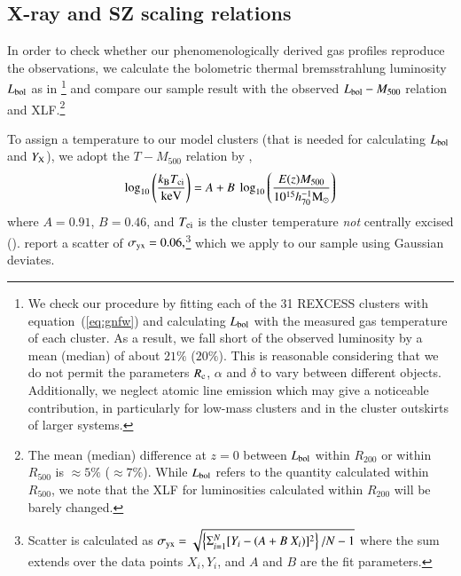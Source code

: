 \documentclass[useAMS,usenatbib]{mn2e}
\begin{document}
\subsection{X-ray and SZ scaling relations}
\label{sec:X-SZ-scaling}

In order to check whether our phenomenologically derived gas profiles reproduce
the observations, we calculate the bolometric thermal bremsstrahlung
luminosity $L_{{\mathrm{bol}}}$ as in \cite{1988xrec.book.....S}\footnote{We check
  our procedure by fitting each of the 31 REXCESS clusters with
  equation~(\ref{eq:gnfw}) and calculating $L_{{\mathrm{bol}}}$ with the measured gas
  temperature of each cluster. As a result, we fall short of the observed
  luminosity by a mean (median) of about $21\%$ ($20\%$). This is reasonable
  considering that we do not permit the parameters $R_{{\mathrm{c}}}$, $\alpha$ and
  $\delta$ to vary between different objects. Additionally, we neglect atomic
  line emission which may give a noticeable contribution, in particularly for
  low-mass clusters and in the cluster outskirts of larger systems.}  and
compare our sample result with the observed $L_{{\mathrm{bol}}} - M_{500}$ relation
and XLF.\footnote{The mean (median) difference at $z=0$ between
  $L_{{\mathrm{bol}}}$ within $R_{200}$ or within $R_{500}$ is $\approx 5\%$ ($\approx
  7\%$). While $L_{{\mathrm{bol}}}$ refers to the quantity calculated within
  $R_{500}$, we note that the XLF for luminosities calculated within $R_{200}$
  will be barely changed.}

To assign a temperature to our model clusters (that is needed for calculating
$L_{{\mathrm{bol}}}$ and $Y_{{\mathrm{X}}}$), we adopt the $T-M_{500}$ relation by
\cite{2010MNRAS.406.1773M},
\begin{equation}
\log_{10} \left( \frac{k_{{\mathrm{B}}}T_{{\mathrm{ci}}}}{{\mathrm{keV}}} \right) = 
A + B~\log_{10} \left( \frac{E(z) M_{500}}{10^{15} h_{70}^{-1} {\mathrm{M_{\odot}}}} \right)
\label{eq:temp}
\end{equation}
where $A=0.91$, $B=0.46$, and $T_{{\mathrm{ci}}}$ is the cluster temperature
\emph{not} centrally excised
(\citealp{2010MNRAS.406.1773M}). \cite{2010MNRAS.406.1773M} report a scatter of
$\sigma_{{\mathrm{yx}}} = 0.06,$\footnote{Scatter is calculated as $\sigma_{{\mathrm{yx}}}
  = \sqrt{ \left\{ \Sigma_{i=1}^{N} [Y_{i}-(A+B~X_{i})]^{2}\right\} / N-1}$
  where the sum extends over the data points $X_{i}, Y_{i}$, and $A$ and $B$ are
  the fit parameters.} which we apply to our sample using Gaussian deviates.
\end{document}
